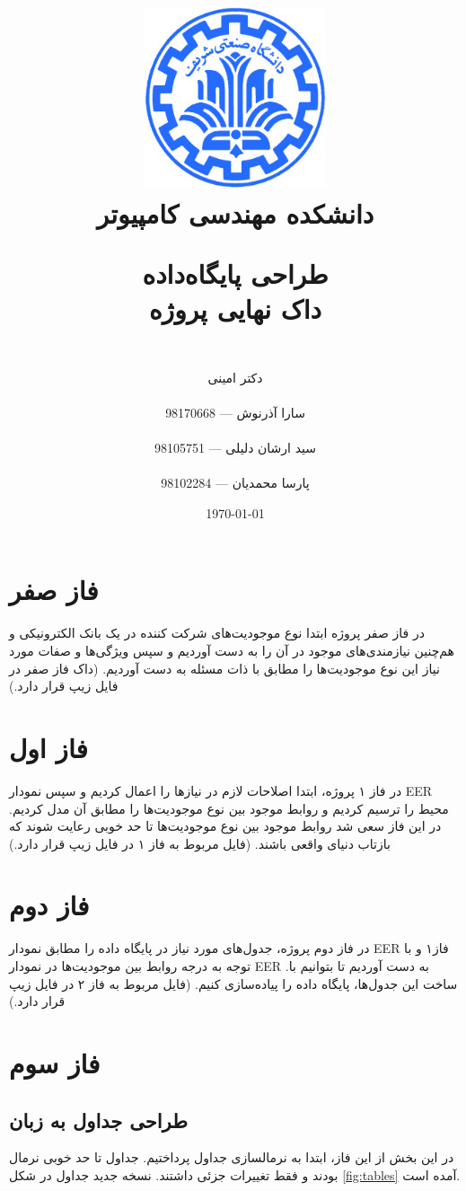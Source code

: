 \documentclass{article}
\title{
\includegraphics[width=0.4\textwidth]{sharif.png}\\
\normalsize{دانشکده مهندسی کامپیوتر}\\
\vspace{1cm}
	
\huge{طراحی پایگاه‌داده}
\\ \vspace{.8cm}
\Large{داک نهایی پروژه}
}
\author{
\\
دکتر امینی
\\ \vspace{.4cm}
\\
  سارا آذرنوش       ---      98170668
\\ \vspace{0.2cm} \\
  سید ارشان دلیلی       ---      98105751
\\ \vspace{0.2cm} \\
  پارسا محمدیان       ---      98102284
\\ \vspace{.4cm}
}
\date{\today}
\begin{document}
\clearpage
\maketitle
\thispagestyle{empty}

\newpage

\clearpage
\pagestyle{fancy}


\tableofcontents

\newpage

\setcounter{page}{1}


\section{فاز صفر}
 در فاز صفر پروژه ابتدا نوع موجودیت‌های شرکت کننده در یک بانک الکترونیکی و هم‌چنین نیازمندی‌های موجود در آن را به دست آوردیم و سپس ویژگی‌ها و صفات مورد نیاز این نوع موجودیت‌ها را مطابق با ذات مسئله به دست آوردیم.
(داک فاز صفر در فایل زیپ قرار دارد.)

\section{فاز اول}

در فاز ۱ پروژه، ابتدا اصلاحات لازم در نیازها را اعمال کردیم و سپس نمودار EER محیط را ترسیم کردیم و روابط موجود بین نوع موجودیت‌ها را مطابق آن مدل کردیم. در این فاز سعی شد روابط موجود بین نوع موجودیت‌ها تا حد خوبی رعایت شوند که بازتاب دنیای واقعی باشند.
(فایل مربوط به فاز ۱ در فایل زیپ قرار دارد.)
\section{فاز دوم}

در فاز دوم پروژه، جدول‌های مورد نیاز در پایگاه داده را مطابق نمودار EER فاز۱ و با توجه به درجه روابط بین موجودیت‌ها در نمودار EER .به دست آوردیم تا بتوانیم با ساخت این جدول‌ها، پایگاه داده را پیاده‌سازی کنیم.
(فایل مربوط به فاز ۲ در فایل زیپ قرار دارد.)


\section{فاز سوم}
\subsection{طراحی جداول به زبان }

در این بخش از این فاز، ابتدا به نرمالسازی جداول پرداختیم. جداول تا حد خوبی نرمال بودند و فقط تغییرات جزئی داشتند. 
نسخه جدید جداول در شکل 
\ref{fig:tables}
آمده است. 
\end{document}
